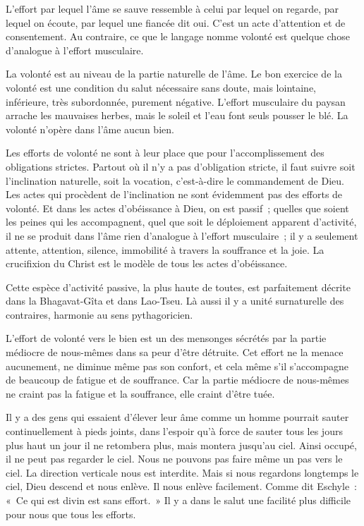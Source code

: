 \documentclass[french,twoside]{book} %
\begin{document}
L'effort par lequel l'âme se sauve ressemble à celui par lequel on regarde, par lequel on écoute, par lequel une fiancée dit oui. C'est un acte d'attention et de consentement. Au contraire, ce que le langage nomme volonté est quelque chose d'analogue à l'effort musculaire.\par
La volonté est au niveau de la partie naturelle de l'âme. Le bon exercice de la volonté est une condition du salut nécessaire sans doute, mais lointaine, inférieure, très subordonnée, purement négative. L'effort musculaire du paysan arrache les mauvaises herbes, mais le soleil et l'eau font seuls pousser le blé. La volonté n'opère dans l'âme aucun bien.\par
Les efforts de volonté ne sont à leur place que pour l'accomplissement des obligations strictes. Partout où il n'y a pas d'obligation stricte, il faut suivre soit l'inclination naturelle, soit la vocation, c'est-à-dire le commandement de Dieu. Les actes qui procèdent de l'inclination ne sont évidemment pas des efforts de volonté. Et dans les actes d'obéissance à Dieu, on est passif ; quelles que soient les peines qui les accompagnent, quel que soit le déploiement apparent d'activité, il ne se produit dans l'âme rien d'analogue à l'effort musculaire ; il y a seulement attente, attention, silence, immobilité à travers la souffrance et la joie. La crucifixion du Christ est le modèle de tous les actes d'obéissance.\par
Cette espèce d'activité passive, la plus haute de toutes, est parfaitement décrite dans la Bhagavat-Gîta et dans Lao-Tseu. Là aussi il y a unité surnaturelle des contraires, harmonie au sens pythagoricien.\par
L'effort de volonté vers le bien est un des mensonges sécrétés par la partie médiocre de nous-mêmes dans sa peur d'être détruite. Cet effort ne la menace aucunement, ne diminue même pas son confort, et cela même s'il s'accompagne de beaucoup de fatigue et de souffrance. Car la partie médiocre de nous-mêmes ne craint pas la fatigue et la souffrance, elle craint d'être tuée.\par
Il y a des gens qui essaient d'élever leur âme comme un homme pourrait sauter continuellement à pieds joints, dans l'espoir qu'à force de sauter tous les jours plus haut un jour il ne retombera plus, mais montera jusqu'au ciel. Ainsi occupé, il ne peut pas regarder le ciel. Nous ne pouvons pas faire même un pas vers le ciel. La direction verticale nous est interdite. Mais si nous regardons longtemps le ciel, Dieu descend et nous enlève. Il nous enlève facilement. Comme dit Eschyle : « Ce qui est divin est sans effort. » Il y a dans le salut une facilité plus difficile pour nous que tous les efforts.\par
\end{document}
